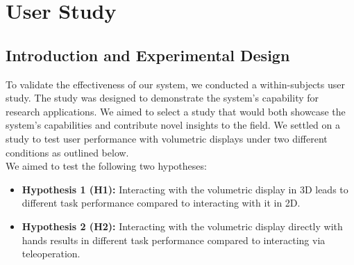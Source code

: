 \section{User Study}
\subsection{Introduction and Experimental Design}
To validate the effectiveness of our system, we conducted a within-subjects user study. The study was designed to demonstrate the system's capability for research applications. We aimed to select a study that would both showcase the system's capabilities and contribute novel insights to the field. We settled on a study to test user performance with volumetric displays under two different conditions as outlined below. \\

We aimed to test the following two hypotheses:
\begin{itemize}[itemsep=-0.3em]
    \item \textbf{Hypothesis 1 (H1):} Interacting with the volumetric display in 3D leads to different task performance compared to interacting with it in 2D.
    \item \textbf{Hypothesis 2 (H2):} Interacting with the volumetric display directly with hands results in different task performance compared to interacting via teleoperation.
\end{itemize}

